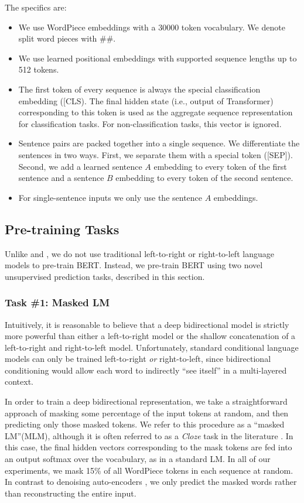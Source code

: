 	The specifics are:
	\begin{itemize}
		\item We use WordPiece embeddings \citep{Yonghui2016} with a 30000 token vocabulary. We denote split word pieces with \#\#.
		\item We use learned positional embeddings with supported sequence lengths up to 512 tokens.
		\item The first token of every sequence is always the special classification embedding ([CLS). The final hidden state (i.e., output of Transformer) corresponding to this token is used as the aggregate sequence representation for classification tasks. For non-classification tasks, this vector is ignored.
		\item Sentence pairs are packed together into a single sequence. We differentiate the sentences in two ways. First, we separate them with a special token ([SEP]). Second, we add a learned sentence $A$ embedding to every token of the first sentence and a sentence $B$ embedding to every token of the second sentence.
		\item For single-sentence inputs we only use the sentence $A$ embeddings.
	\end{itemize}
	
	\subsection {Pre-training Tasks} \label{sec3.3}
	Unlike \citet{Matthew2018} and \citet{Alec2018}, we do not use traditional left-to-right or right-to-left language models to pre-train BERT. Instead, we pre-train BERT using two novel unsupervised prediction tasks, described in this section.
	
		\subsubsection{Task \#1: Masked LM} \label{sec3.3.1}
		Intuitively, it is reasonable to believe that a deep bidirectional model is strictly more powerful than either a left-to-right model or the shallow concatenation of a left-to-right and right-to-left model. Unfortunately, standard conditional language models can only be trained left-to-right \emph{or} right-to-left, since bidirectional conditioning would allow each word to indirectly ``see itself'' in a multi-layered context.
		
		In order to train a deep bidirectional representation, we take a straightforward approach of masking some percentage of the input tokens at random, and then predicting only those masked tokens. We refer to this procedure as a ``masked LM''(MLM), although it is often referred to as a \emph{Cloze} task in the literature \citep{Wilson1953}. In this case, the final hidden vectors corresponding to the mask tokens are fed into an output softmax over the vocabulary, as in a standard LM. In all of our experiments, we mask 15\% of all WordPiece tokens in each sequence at random. In contrast to denoising auto-encoders \citep{Pascal2008}, we only predict the masked words rather than reconstructing the entire input.
		
